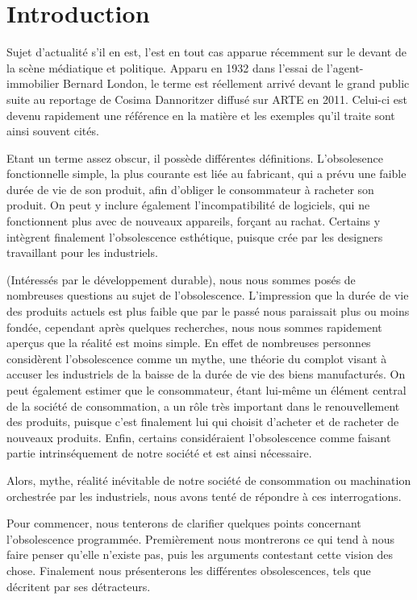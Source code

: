\chapter*{Introduction}

Sujet d'actualité s'il en est, l'\op est en tout cas apparue récemment sur le devant de la scène médiatique et politique. Apparu en 1932 dans l'essai de l'agent-immobilier Bernard London, le terme est réellement arrivé devant le grand public suite au reportage de Cosima Dannoritzer diffusé sur ARTE en 2011. Celui-ci est devenu rapidement une référence en la matière et les exemples qu'il traite sont ainsi souvent cités.

Etant un terme assez obscur, il possède différentes définitions. L'obsolesence fonctionnelle simple, la plus courante est liée au fabricant, qui a prévu une faible durée de vie de son produit, afin d'obliger le consommateur à racheter son produit. On peut y inclure également l'incompatibilité de logiciels, qui ne fonctionnent plus avec de nouveaux appareils, forçant au rachat. Certains y intègrent finalement l'obsolescence esthétique, puisque crée par les designers travaillant pour les industriels.

(Intéressés par le développement durable), nous nous sommes posés de nombreuses questions au sujet de l'obsolescence. L'impression que la durée de vie des produits actuels est plus faible que par le passé nous paraissait plus ou moins fondée, cependant après quelques recherches, nous nous sommes rapidement aperçus que la réalité est moins simple. En effet de nombreuses personnes considèrent l'obsolescence comme un mythe, une théorie du complot visant à accuser les industriels de la baisse de la durée de vie des biens manufacturés. On peut également estimer que le consommateur, étant lui-même un élément central de la société de consommation, a un rôle très important dans le renouvellement des produits, puisque c'est finalement lui qui choisit d'acheter et de racheter de nouveaux produits. Enfin, certains considéraient l'obsolescence comme faisant partie intrinséquement de notre société et est ainsi nécessaire.

\smallbreak Alors, mythe, réalité inévitable de notre société de consommation ou machination orchestrée par les industriels, nous avons tenté de répondre à ces interrogations.

\smallbreak Pour commencer, nous tenterons de clarifier quelques points concernant l'obsolescence programmée. Premièrement nous montrerons ce qui tend à nous faire penser qu'elle n'existe pas, puis les arguments contestant cette vision des chose. Finalement nous présenterons les différentes obsolescences, tels que décritent par ses détracteurs.

